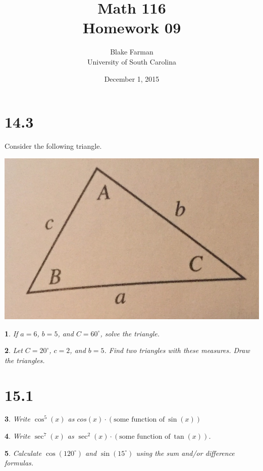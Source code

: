\documentclass[12pt]{amsart}
\author{Blake Farman\\University of South Carolina}
\title{Math 116\\Homework 09}
\date{December 1, 2015}
\theoremstyle{plain}
\newtheorem{thm}{}
\begin{document}
\maketitle

\section*{14.3}
\renewcommand{\exp}[1]{\operatorname{e}^{#1}}
Consider the following triangle.\\
\begin{center}
  \includegraphics[scale=0.25]{triangle.jpg}
\end{center}
\setcounter{thm}{1}
\begin{thm}
  If $a = 6$, $b = 5$, and $C = 60^\circ$, solve the triangle.
\end{thm}

\setcounter{thm}{3}
\begin{thm}
  Let $C = 20^\circ$, $c = 2$, and $b = 5$.
  Find two triangles with these measures.
  Draw the triangles.
\end{thm}

\newpage
\section*{15.1}

\setcounter{thm}{1}
\begin{thm}
  Write $\cos^5(x)$ as $cos(x) \cdot (\text{some function of}\ \sin(x))$
\end{thm}

\setcounter{thm}{3}
\begin{thm}
  Write $\sec^7(x)$ as $\sec^2(x) \cdot (\text{some function of}\ \tan(x))$.
\end{thm}

\setcounter{thm}{5}
\begin{thm}
  Calculate $\cos(120^\circ)$ and $\sin(15^\circ)$ using the sum and/or difference formulas.
\end{thm}
\end{document}
